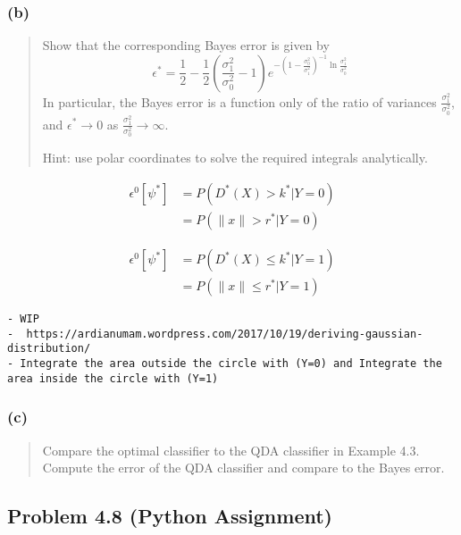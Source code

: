 \documentclass[
  letterpaper,
  DIV=11,
  numbers=noendperiod]{scrartcl}
\begin{document}
\hypertarget{b-1}{%
\subsubsection{(b)}\label{b-1}}

\begin{quote}
Show that the corresponding Bayes error is given by
\[\epsilon^{*} = \frac{1}{2} - \frac{1}{2}(\frac{\sigma^{2}_{1}}{\sigma^{2}_{0}} - 1)e^{-(1-\frac{\sigma^{2}_{0}}{\sigma^{2}_{1}})^{-1}\ln \frac{\sigma^{2}_{1}}{\sigma^{2}_{0}}}\]
In particular, the Bayes error is a function only of the ratio of
variances \(\frac{\sigma^{2}_{1}}{\sigma^{2}_{0}}\), and
\(\epsilon^{*}\rightarrow 0\) as
\(\frac{\sigma^{2}_{1}}{\sigma^{2}_{0}} \rightarrow \infty\).

Hint: use polar coordinates to solve the required integrals
analytically.
\end{quote}

\begin{align}
    \epsilon^{0}[\psi^{*}] 
    &= P(D^{*}(X)>k^{*}|Y=0)\\ 
    &= P(\|x\|>r^{*} | Y=0)
\end{align}

\begin{align}
    \epsilon^{0}[\psi^{*}] 
    &= P(D^{*}(X)\leq k^{*}|Y=1)\\ 
    &= P(\|x\|\leq r^{*} | Y=1)
\end{align}

\begin{verbatim}
- WIP
-  https://ardianumam.wordpress.com/2017/10/19/deriving-gaussian-distribution/
- Integrate the area outside the circle with (Y=0) and Integrate the area inside the circle with (Y=1)
\end{verbatim}

\hypertarget{c-1}{%
\subsubsection{(c)}\label{c-1}}

\begin{quote}
Compare the optimal classifier to the QDA classifier in Example 4.3.
Compute the error of the QDA classifier and compare to the Bayes error.
\end{quote}

\hypertarget{problem-4.8-python-assignment}{%
\subsection{Problem 4.8 (Python
Assignment)}\label{problem-4.8-python-assignment}}
\end{document}
